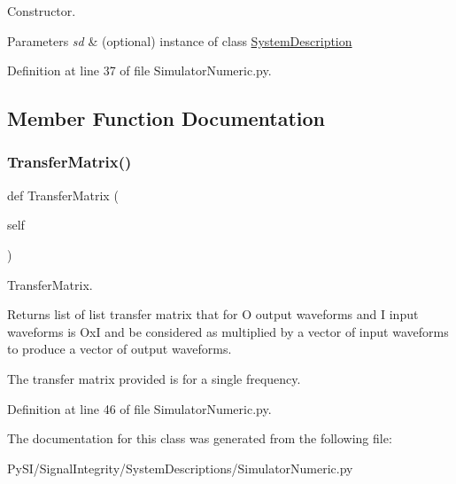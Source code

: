 Constructor. 


\begin{DoxyParams}{Parameters}
{\em sd} & (optional) instance of class \hyperlink{namespaceSignalIntegrity_1_1SystemDescriptions_1_1SystemDescription}{System\+Description} \\
\hline
\end{DoxyParams}


Definition at line 37 of file Simulator\+Numeric.\+py.



\subsection{Member Function Documentation}
\mbox{\label{classSignalIntegrity_1_1SystemDescriptions_1_1SimulatorNumeric_1_1SimulatorNumeric_aecf838369a0d4e9037ba351539bd8eb1}} 
\subsubsection{\texorpdfstring{Transfer\+Matrix()}{TransferMatrix()}}
{\footnotesize\ttfamily def Transfer\+Matrix (\begin{DoxyParamCaption}\item[{}]{self }\end{DoxyParamCaption})}



Transfer\+Matrix. 

\begin{DoxyReturn}{Returns}
list of list transfer matrix that for O output waveforms and I input waveforms is OxI and be considered as multiplied by a vector of input waveforms to produce a vector of output waveforms.
\end{DoxyReturn}
The transfer matrix provided is for a single frequency. 

Definition at line 46 of file Simulator\+Numeric.\+py.



The documentation for this class was generated from the following file\+:\begin{DoxyCompactItemize}
\item 
Py\+S\+I/\+Signal\+Integrity/\+System\+Descriptions/Simulator\+Numeric.\+py\end{DoxyCompactItemize}
